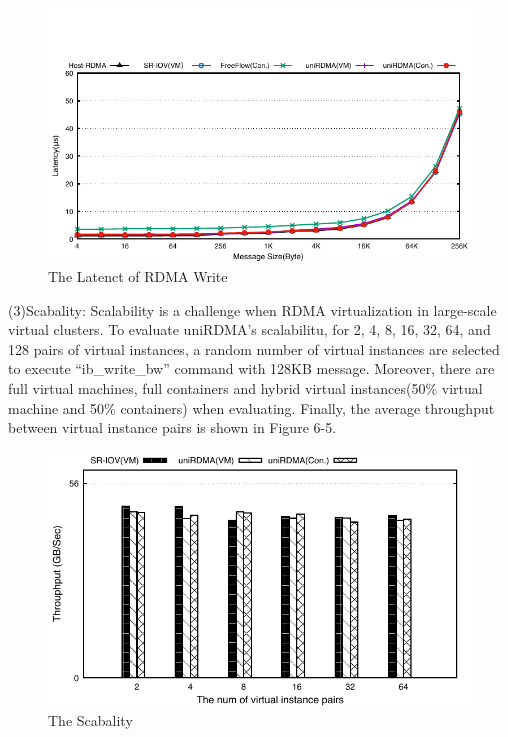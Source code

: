 \begin{figure}[!ht]
	\centering
	\includegraphics[width=1.0\linewidth]{images/write-lat}
	\caption{The Latenct of RDMA Write}
	\label{fig:write-lat}
\end{figure}
(3)Scabality: 
Scalability is a challenge when RDMA virtualization in large-scale virtual clusters. To evaluate uniRDMA's scalabilitu, for 2, 4, 8, 16, 32, 64, and 128 pairs of virtual instances, a random number of virtual instances are selected to execute ``ib\_write\_bw'' command with 128KB message. Moreover, there are full virtual machines, full containers and hybrid virtual instances(50\% virtual machine and 50\% containers) when evaluating. Finally, the average throughput between virtual instance pairs is shown in Figure 6-5.

\begin{figure}[!ht]
	\centering
	\includegraphics[width=1.0\linewidth]{images/scabality}
	\caption{The Scabality}
	\label{fig:scabality}
\end{figure}

